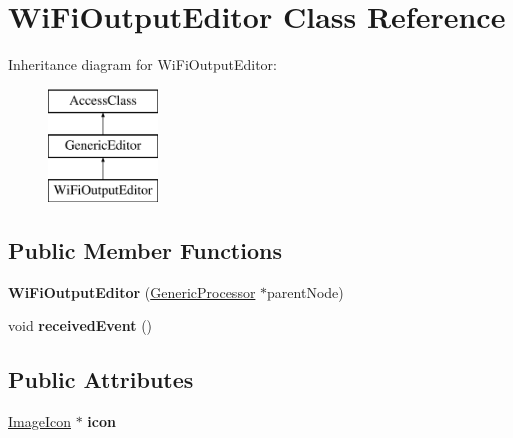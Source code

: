 \hypertarget{classWiFiOutputEditor}{\section{Wi\-Fi\-Output\-Editor Class Reference}
\label{classWiFiOutputEditor}
}
Inheritance diagram for Wi\-Fi\-Output\-Editor\-:\begin{figure}[H]
\begin{center}
\leavevmode
\includegraphics[height=3.000000cm]{classWiFiOutputEditor}
\end{center}
\end{figure}
\subsection*{Public Member Functions}
\begin{DoxyCompactItemize}
\item 
\hypertarget{classWiFiOutputEditor_a13b5925f4abc796e8ff832452f31f675}{{\bfseries Wi\-Fi\-Output\-Editor} (\hyperlink{classGenericProcessor}{Generic\-Processor} $\ast$parent\-Node)}\label{classWiFiOutputEditor_a13b5925f4abc796e8ff832452f31f675}

\item 
\hypertarget{classWiFiOutputEditor_ae5491f857b3beaa7a1468464388262da}{void {\bfseries received\-Event} ()}\label{classWiFiOutputEditor_ae5491f857b3beaa7a1468464388262da}

\end{DoxyCompactItemize}
\subsection*{Public Attributes}
\begin{DoxyCompactItemize}
\item 
\hypertarget{classWiFiOutputEditor_a8016b761986da121da2b65c24a32c21f}{\hyperlink{classImageIcon}{Image\-Icon} $\ast$ {\bfseries icon}}\label{classWiFiOutputEditor_a8016b761986da121da2b65c24a32c21f}

\end{DoxyCompactItemize}
